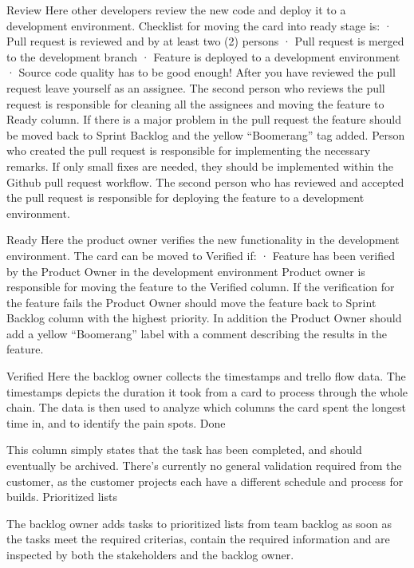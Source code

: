 \documentclass[english]{tktltiki2}
\theoremstyle{definition}
\theoremstyle{remark}
\begin{document}
Review
Here other developers review the new code and deploy it to a development environment. Checklist for moving the card into ready stage is:
·       Pull request is reviewed and by at least two (2) persons
·       Pull request is merged to the development branch
·       Feature is deployed to a development environment
·       Source code quality has to be good enough!
After you have reviewed the pull request leave yourself as an assignee. The second person who reviews the pull request is responsible for cleaning all the assignees and moving the feature to Ready column.
If there is a major problem in the pull request the feature should be moved back to Sprint Backlog and the yellow “Boomerang” tag added. Person who created the pull request is responsible for implementing the necessary remarks.
If only small fixes are needed, they should be implemented within the Github pull request workflow.
The second person who has reviewed and accepted the pull request is responsible for deploying the feature to a development environment.

Ready
Here the product owner verifies the new functionality in the development environment. The card can be moved to Verified if:
·       Feature has been verified by the Product Owner in the development environment
Product owner is responsible for moving the feature to the Verified column.
If the verification for the feature fails the Product Owner should move the feature back to Sprint Backlog column with the highest priority. In addition the Product Owner should add a yellow “Boomerang” label with a comment describing the results in the feature.

Verified
Here the backlog owner collects the timestamps and trello flow data. The timestamps depicts the duration it took from a card to process through the whole chain. The data is then used to analyze which columns the card spent the longest time in, and to identify the pain spots.
Done

This column simply states that the task has been completed, and should eventually be archived. There’s currently no general validation required from the customer, as the customer projects each have a different schedule and process for builds.
Prioritized lists

The backlog owner adds tasks to prioritized lists from team backlog as soon as the tasks meet the required criterias, contain the required information and are inspected by both the stakeholders and the backlog owner.

\end{document}
